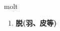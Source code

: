 
\begin{frame}
{\huge molt}
\begin{center}
\begin{enumerate}\Large
  \item \textbf{脱(羽、皮等)}
\end{enumerate}
\end{center}
\end{frame}
